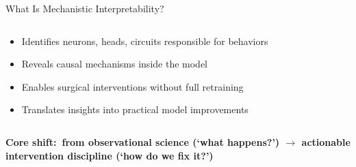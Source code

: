 \begin{frame}{What Is Mechanistic Interpretability?}
\begin{columns}[T]
    \begin{tcolorbox}[enhanced, colback=UCRlgray, colframe=UCRnavy,
        toprule=2pt, sharp corners, fonttitle=\bfseries\small\color{UCRnavy},
        title=Mechanistic Interpretability]
      \begin{itemize}\footnotesize\setlength\itemsep{3pt}
        \item Identifies neurons, heads, circuits responsible for behaviors
        \item Reveals causal mechanisms inside the model
        \item Enables surgical interventions without full retraining
        \item Translates insights into practical model improvements
      \end{itemize}
    \end{tcolorbox}
  \end{columns}
  \vspace{0.3em}
  \begin{ucrinfo}[UCRnavy]
    \footnotesize\bfseries Core shift:\normalfont\ from observational science
    (`what happens?') $\to$ actionable intervention discipline (`how do we fix it?')
  \end{ucrinfo}
\end{frame}


